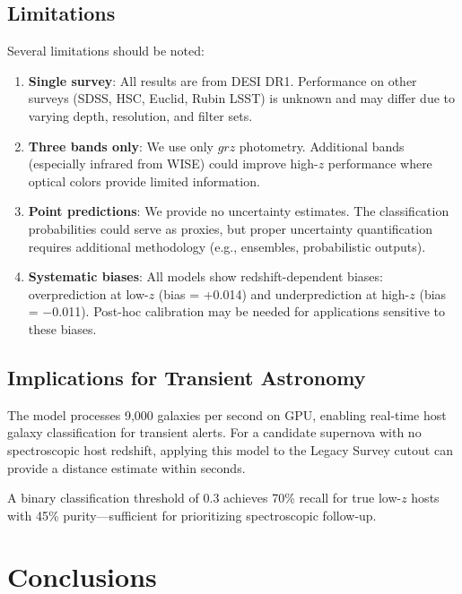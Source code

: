 \documentclass[linenumbers,twocolumn]{aastex7}
\begin{document}
\subsection{Limitations}

Several limitations should be noted:

\begin{enumerate}
    \item \textbf{Single survey}: All results are from DESI DR1. Performance on 
    other surveys (SDSS, HSC, Euclid, Rubin LSST) is unknown and may differ due 
    to varying depth, resolution, and filter sets.
    
    \item \textbf{Three bands only}: We use only $grz$ photometry. Additional 
    bands (especially infrared from WISE) could improve high-$z$ performance 
    where optical colors provide limited information.
    
    \item \textbf{Point predictions}: We provide no uncertainty estimates. The 
    classification probabilities could serve as proxies, but proper uncertainty 
    quantification requires additional methodology (e.g., ensembles, probabilistic 
    outputs).
    
    \item \textbf{Systematic biases}: All models show redshift-dependent biases: 
    overprediction at low-$z$ (bias = +0.014) and underprediction at high-$z$ 
    (bias = $-$0.011). Post-hoc calibration may be needed for applications 
    sensitive to these biases.
\end{enumerate}

\subsection{Implications for Transient Astronomy}

The model processes 9,000 galaxies per second on GPU, enabling real-time host 
galaxy classification for transient alerts. For a candidate supernova with no 
spectroscopic host redshift, applying this model to the Legacy Survey cutout 
can provide a distance estimate within seconds.

A binary classification threshold of 0.3 achieves 70\% recall for true low-$z$ 
hosts with 45\% purity---sufficient for prioritizing spectroscopic follow-up.

\section{Conclusions}
\label{sec:conclusions}
\end{document}
